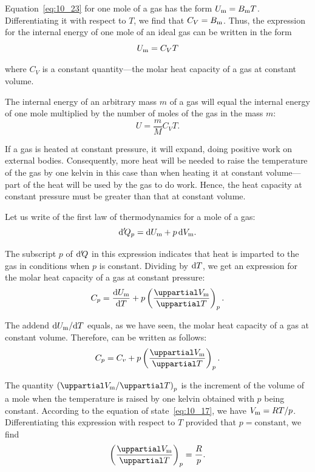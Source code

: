 Equation~\eqref{eq:10_23} for one mole of a gas has the form $U_{\text{m}}=B_{\text{m}}T$. Differentiating it with respect to $T$, we find that $C_V=B_{\text{m}}$. Thus, the expression for the internal energy of one mole of an ideal gas can be written in the form
\begin{equation}\label{eq:10_28}
	U_{\text{m}} = C_V T
\end{equation}

\noindent
where $C_V$ is a constant quantity---the molar heat capacity of a gas at constant volume.

The internal energy of an arbitrary mass $m$ of a gas will equal the internal energy of one mole multiplied by the number of moles of the gas in the mass $m$:
\begin{equation}\label{eq:10_29}
	U = \frac{m}{M}C_V T.
\end{equation}

If a gas is heated at constant pressure, it will expand, doing positive work on external bodies. Consequently, more heat will be needed to raise the temperature of the gas by one kelvin in this case than when heating it at constant volume---part of the heat will be used by the gas to do work. Hence, the heat capacity at constant pressure must be greater than that at constant volume.

Let us write  of the first law of thermodynamics for a mole of a gas:
\begin{equation}\label{eq:10_30}
	\mathrm{d}'\!Q_p = \mathrm{d}U_{\text{m}} + p\,\mathrm{d}V_{\text{m}}.
\end{equation}

\noindent
The subscript $p$ of $\mathrm{d}'\!Q$ in this expression indicates that heat is imparted to the gas in conditions when $p$ is constant. Dividing  by $\mathrm{d} T$, we get an expression for the molar heat capacity of a gas at constant pressure:
\begin{equation}\label{eq:10_31}
	C_p = \diff{\ab{U}{m}}{T} + p\left(\diffpartial{\ab{V}{m}}{T}\right)_p.
\end{equation}

\noindent
The addend $\mathrm{d}U_{\text{m}}/\mathrm{d} T$ equals, as we have seen, the molar heat capacity of a gas at constant volume. Therefore,  can be written as follows:
\begin{equation}\label{eq:10_32}
	C_p = C_v + p\left(\diffpartial{\ab{V}{m}}{T}\right)_p.
\end{equation}

The quantity $\left(\diffinpartial{\ab{V}{m}}{T}\right)_p$ is the increment of the volume of a mole when the temperature is raised by one kelvin obtained with $p$ being constant. According to the equation of state~\eqref{eq:10_17}, we have $V_{\text{m}}=RT/p$. Differentiating this expression with respect to $T$ provided that $p=\text{constant}$, we find
\begin{equation*}
	\left(\diffpartial{\ab{V}{m}}{T}\right)_p = \frac{R}{p}.
\end{equation*}

